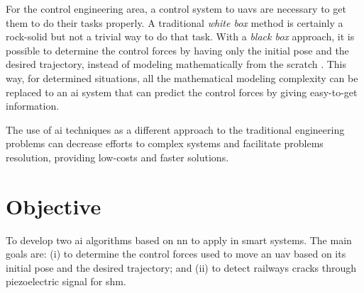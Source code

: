 For the control engineering area, a control system to \glspl*{uav} are necessary to get them to do their tasks properly.
A traditional \emph{white box} method is certainly a rock-solid but not a trivial way to do that task. 
With a \emph{black box} approach, it is possible to determine the control forces by having only the initial pose and the desired trajectory, instead of modeling mathematically from the scratch \citep{loyola-gonzalez2019,wu2016}.
This way, for determined situations, all the mathematical modeling complexity can be replaced to an \gls*{ai} system that can predict the control forces by giving easy-to-get information.

The use of \gls*{ai} techniques as a different approach to the traditional engineering problems can decrease efforts to complex systems and facilitate problems resolution, providing low-costs and faster solutions. 

\section{Objective}

To develop two \gls*{ai} algorithms based on \gls*{nn} to apply in smart systems.
The main goals are: (i) to determine the control forces used to move an \gls*{uav} based on its initial pose and the desired trajectory; and (ii) to detect railways cracks through piezoelectric signal for \gls*{shm}.